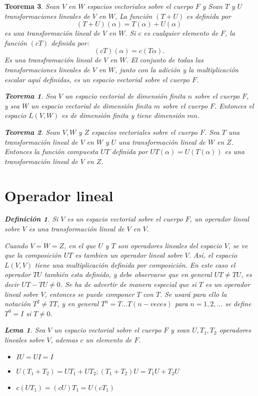 \documentclass[b5paper, 11pt]{book}
\newcommand{\0}{\mathbf{0}}
\theoremstyle{estiloB}
\theoremstyle{estiloC}
\newtheorem{unteo}{Teorema}[chapter]
\newtheorem{unadefi}{Definición}[chapter]
\theoremstyle{estiloD}
\newtheorem{lema}{Lema}
\theoremstyle{estiloE}
\begin{document}
\begin{unteo}
Sean $V$ en $W$ espacios vectoriales sobre el cuerpo $F$ y Sean $T$ y $U$ transformaciones lineales de $V$ en $W$, La funci\'on $(T+U)$ es definida por
\[
(T+U)(\alpha) = T(\alpha)+U(\alpha)
\]
es una transformaci\'on lineal de $V$ en $W$. Si $c$ es cualquier elemento de $F$, la funci\'on $(cT)$ definida por:
\[
(cT)(\alpha) = c(T\alpha).
\]
Es una transfromaci\'on lineal de $V$ en $W$. El conjunto de todas las transformaciones lineales de $V$ en $W$, junto con la adici\'on y la multiplicaci\'on escalar aquí definidas, es un espacio vectorial sobre el cuerpo $F$.
\begin{unteo}
Sea $V$ un espacio vectorial de dimensi\'on finita $n$ sobre el cuerpo $F$, y sea $W$ un espacio vectorial de dimensi\'on finita $m$ sobre el cuerpo $F$. Entonces el espacio $L(V,W)$ es de dimensi\'on finita y tiene dimensi\'on $mn$.
\end{unteo}

\begin{unteo}
 Sean $V,W$ y $Z$ espacios vectoriales sobre el cuerpo $F$. Sea $T$ una transformaci\'on lineal de $V$ en $W$ y $U$ una transformaci\'on lineal de $W$ en $Z$. Entonces la funci\'on compuesta $UT$ definida por $UT(\alpha) = U(T(\alpha))$ es una transformaci\'on lineal de $V$ en $Z$.
\end{unteo}
\section{Operador lineal}
\begin{unadefi}
Si $V$ es un espacio vectorial sobre el cuerpo $F$, un \textit{operador lineal} sobre $V$ es una transformaci\'on lineal de $V$ en $V.$
\end{unadefi}
Cuando $V = W = Z$, en el que $U$ y $T$ son operadores lineales del espacio $V$, se ve que la composici\'on $UT$ es tambien un operador lineal sobre $V$. Asi, el espacio $L(V,V)$ tiene una \textit{multiplicaci\'on} definida por composici\'on. En este caso el operador $TU$ tambi\'en esta definido, y debe observarse que en general $UT \ne TU$, es decir $UT-TU \ne 0$. Se ha de advertir de manera especial que si $T$ es un operador lineal sobre $V$, entonces se puede componer $T$ con $T$. Se usar\'a para ello la notaci\'on $T^{2} \ne TT$, y en general $T^{n} = T\ldots T(n-veces)$ para $n = 1,2,\ldots$ se define $T^{0} = I$ si $T \ne 0$.

\begin{lema}
Sea $V$ un espacio vectorial sobre el cuerpo $F$ y sean $U,T_{1},T_{2}$ operadores lineales sobre $V$, ademas $c$ un elemento de $F$. 
\begin{itemize}
\item[a.] $IU = UI = I$
\item[b.] $U(T_{1} + T_{2}) = UT_{1} + UT_{2}; (T_{1} + T_{2})U = T_{1}U + T_{2}U$ 
\item[c.] $c(UT_{1}) = (cU)T_{1} = U(cT_{1})$ 
\end{itemize}
\end{lema}


\end{unteo}
\end{document}
